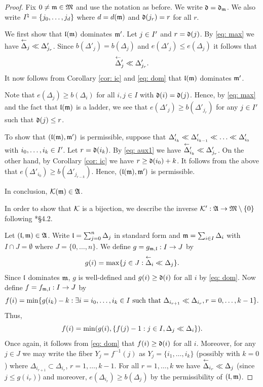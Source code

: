 \documentclass{ert-l} %
\begin{document}
\begin{proof}
Fix $0\neq \mathfrak{m}\in \mathfrak{M}$ and use the notation as before. We write $\mathfrak{d}=\mathfrak{d}_{\mathfrak{m}}$.
We also write $I^{\natural}=\{j_0,\dots,j_d\}$ where $d=d(\mathfrak{m})$ and $\mathfrak{d}(j_r)=r$ for all $r$.

We first show that $\mathfrak{l}(\mathfrak{m})$ dominates $\mathfrak{m}'$.
Let $j\in I'$ and $r=\mathfrak{d}(j)$.
By \eqref{eq: max} we have $\lshft\Delta_j\smlr\Delta'_{j_r}$.
Since $b(\Delta'_j)=b(\Delta_j)$ and $e(\Delta'_j)\le e(\Delta_j)$ it follows that
\begin{equation} \label{eq: aux1}
\lshft\Delta'_j\smlr\Delta'_{j_r}.
\end{equation}
It now follows from Corollary \ref{cor: ic} and \eqref{eq: dom} that $\mathfrak{l}(\mathfrak{m})$ dominates $\mathfrak{m}'$.


Note that $e(\Delta_j)\ge b(\Delta_i)$ for all $i,j\in I$ with $\mathfrak{d}(i) = \mathfrak{d}(j)$. Hence, by \eqref{eq: max} and the fact that $\mathfrak{l}(\mathfrak{m})$ is a ladder, we see that
$e(\Delta'_j)\ge b(\Delta'_{j_r})$ for any $j\in I'$ such that $\mathfrak{d}(j)\le r$.


To show that $(\mathfrak{l}(\mathfrak{m}),\mathfrak{m}')$ is permissible, suppose that $\Delta'_{i_k}\smlr\Delta'_{i_{k-1}}\smlr\dots\smlr\Delta'_{i_0}$ with $i_0,\dots,i_k\in I'$.
Let $r=\mathfrak{d}(i_k)$. By \eqref{eq: aux1} we have $\lshft\Delta'_{i_k}\smlr\Delta'_{j_r}$.
On the other hand, by Corollary \ref{cor: ic} we have $r\ge\mathfrak{d}(i_0)+k$.
It follows from the above that $e(\Delta'_{i_0})\ge b(\Delta'_{j_{r-k}})$.
Hence, $(\mathfrak{l}(\mathfrak{m}),\mathfrak{m}')$ is permissible.

In conclusion, $\mathcal{K}(\mathfrak{m})\in\mathfrak{A}$.

In order to show that $\mathcal{K}$ is a bijection, we describe the inverse $\mathcal{K'}:\mathfrak{A}\rightarrow\mathfrak{M}\setminus\{0\}$
following \cite{MR1464693}*{\S4.2}.

Let $(\mathfrak{l},\mathfrak{m})\in\mathfrak{A}$. Write $\mathfrak{l}=\sum_{j=0}^n\Delta_j$ in standard form
and $\mathfrak{m}=\sum_{i\in I}\Delta_i$ with $I\cap J=\emptyset$ where $J=\{0,\dots,n\}$.
We define $g=g_{\mathfrak{m},\mathfrak{l}}:I\rightarrow J$ by
\[
g(i)=\max\{j\in J:\lshft\Delta_i\smlr\Delta_j\}.
\]
Since $\mathfrak{l}$ dominates $\mathfrak{m}$, $g$ is well-defined and $g(i)\ge\mathfrak{d}(i)$ for all $i$ by \eqref{eq: dom}.
Now define $f=f_{\mathfrak{m},\mathfrak{l}}:I\rightarrow J$ by
\[
f(i)=\min\{g(i_k)-k:\exists i=i_0,\dots,i_k\in I\text{ such that }\Delta_{i_{r+1}}\ll\Delta_{i_r}, r=0,\dots,k-1\}.
\]
Thus,
\[
f(i)=\min(g(i),\{f(j)-1:j\in I, \Delta_j\ll\Delta_i\}).
\]
Once again, it follows from \eqref{eq: dom} that $f(i)\ge\mathfrak{d}(i)$ for all $i$.
Moreover, for any $j\in J$ we may write the fiber $Y_j=f^{-1}(j)$
as $Y_j=\{i_1,\dots,i_k\}$ (possibly with $k=0$) where $\Delta_{i_{r+1}}\subset\Delta_{i_r}$, $r=1,\dots,k-1$.
For all $r=1,\dots,k$ we have $\lshft\Delta_{i_r}\smlr\Delta_j$ (since $j\le g(i_r)$) and moreover,
$e(\Delta_{i_r})\ge b(\Delta_j)$ by the permissibility of $(\mathfrak{l},\mathfrak{m})$.


\end{proof}
\end{document}
